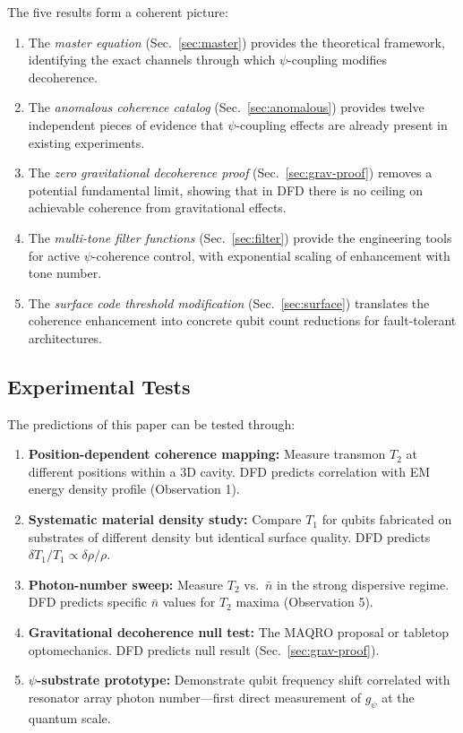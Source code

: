 \documentclass[aps,prl,twocolumn,superscriptaddress,nofootinbib,longbibliography]{revtex4-2}
\begin{document}
The five results form a coherent picture:
\begin{enumerate}
\item The \emph{master equation} (Sec.~\ref{sec:master}) provides the
theoretical framework, identifying the exact channels through which
$\psi$-coupling modifies decoherence.
\item The \emph{anomalous coherence catalog} (Sec.~\ref{sec:anomalous})
provides twelve independent pieces of evidence that $\psi$-coupling
effects are already present in existing experiments.
\item The \emph{zero gravitational decoherence proof}
(Sec.~\ref{sec:grav-proof}) removes a potential fundamental limit,
showing that in DFD there is no ceiling on achievable coherence from
gravitational effects.
\item The \emph{multi-tone filter functions} (Sec.~\ref{sec:filter})
provide the engineering tools for active $\psi$-coherence control,
with exponential scaling of enhancement with tone number.
\item The \emph{surface code threshold modification}
(Sec.~\ref{sec:surface}) translates the coherence enhancement into
concrete qubit count reductions for fault-tolerant architectures.
\end{enumerate}

\subsection{Experimental Tests}

The predictions of this paper can be tested through:
\begin{enumerate}
\item \textbf{Position-dependent coherence mapping:} Measure transmon
$T_2$ at different positions within a 3D cavity. DFD predicts correlation
with EM energy density profile (Observation 1).
\item \textbf{Systematic material density study:} Compare $T_1$ for
qubits fabricated on substrates of different density but identical
surface quality. DFD predicts $\delta T_1/T_1 \propto \delta\rho/\rho$.
\item \textbf{Photon-number sweep:} Measure $T_2$ vs.\ $\bar{n}$ in the
strong dispersive regime. DFD predicts specific $\bar{n}$ values for
$T_2$ maxima (Observation 5).
\item \textbf{Gravitational decoherence null test:} The MAQRO proposal
or tabletop optomechanics. DFD predicts null result (Sec.~\ref{sec:grav-proof}).
\item \textbf{$\psi$-substrate prototype:} Demonstrate qubit frequency
shift correlated with resonator array photon number---first direct
measurement of $g_\psi$ at the quantum scale.
\end{enumerate}
\end{document}
